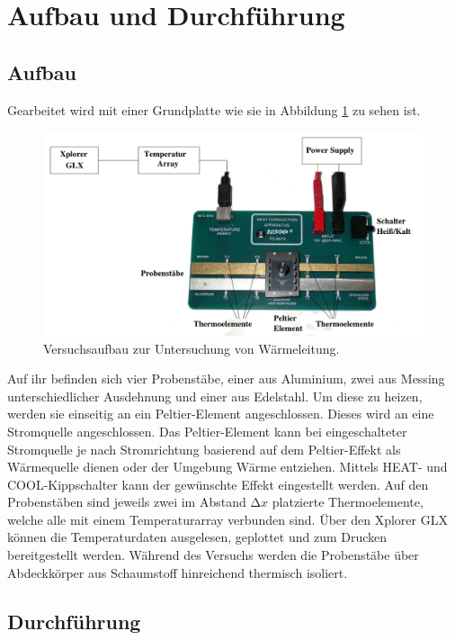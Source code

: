
\section{Aufbau und Durchführung}
\label{sec:Durchführung}

\subsection{Aufbau}

Gearbeitet wird mit einer Grundplatte wie sie in Abbildung \ref{df:1} zu sehen ist.
\begin{figure}[H]
  \centering
  \includegraphics[height=6cm]{aufbau.png}
  \caption{Versuchsaufbau zur Untersuchung von Wärmeleitung. \cite{sample}}
  \label{df:1}
\end{figure}
Auf ihr befinden sich vier Probenstäbe, einer aus Aluminium, zwei aus Messing unterschiedlicher Ausdehnung und einer aus Edelstahl.
Um diese zu heizen, werden sie einseitig an ein Peltier-Element angeschlossen.
Dieses wird an eine Stromquelle angeschlossen.
Das Peltier-Element kann bei eingeschalteter Stromquelle je nach Stromrichtung basierend auf dem Peltier-Effekt als Wärmequelle dienen oder der Umgebung Wärme entziehen.
Mittels HEAT- und COOL-Kippschalter kann der gewünschte Effekt eingestellt werden.
Auf den Probenstäben sind jeweils zwei im Abstand $\increment x$ platzierte Thermoelemente, welche alle mit einem Temperaturarray verbunden sind.
Über den Xplorer GLX können die Temperaturdaten ausgelesen, geplottet und zum Drucken bereitgestellt werden.
Während des Versuchs werden die Probenstäbe über Abdeckkörper aus Schaumstoff hinreichend thermisch isoliert.

\subsection{Durchführung}

